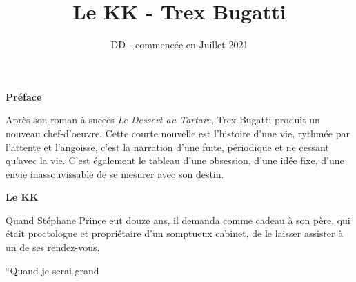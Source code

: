 \documentclass[french,amstex,12pt,a5paper]{book}
\begin{document}
\title{Le KK - Trex Bugatti}
\author{DD - commencée en Juillet 2021}
\maketitle

\begin{center}
 {\bf Préface}\\
\end{center}


Après son roman à succès {\it Le Dessert au Tartare}, Trex Bugatti produit un nouveau chef-d'oeuvre. Cette courte nouvelle est l'histoire d'une vie, rythmée par l'attente et l'angoisse, c'est la narration d'une fuite, périodique et ne cessant qu'avec la vie. C'est également le tableau d'une obsession, d'une idée fixe, d'une envie inassouvissable de se mesurer avec son destin.\\

\begin{center}
 {\bf Le KK}\\
\end{center}

Quand Stéphane Prince eut douze ans, il demanda comme cadeau à son père, qui était proctologue et propriétaire d'un somptueux cabinet, de le laisser assister à un de ses rendez-vous.

``Quand je serai grand
\end{document}
